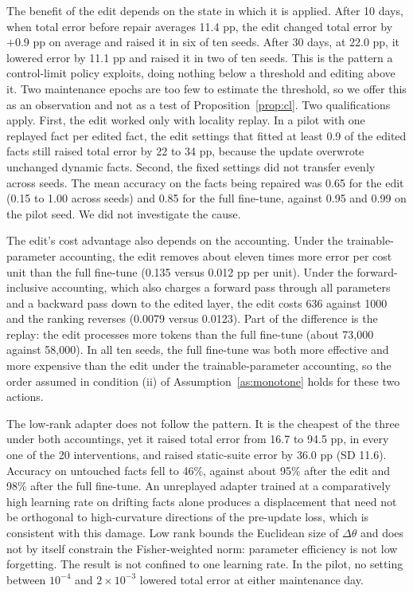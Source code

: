 \documentclass[journal]{IEEEtran}
\begin{document}
The benefit of the edit depends on the state in which it is applied. After 10 days, when total error before repair averages 11.4 pp, the edit changed total error by $+0.9$ pp on average and raised it in six of ten seeds. After 30 days, at 22.0 pp, it lowered error by 11.1 pp and raised it in two of ten seeds. This is the pattern a control-limit policy exploits, doing nothing below a threshold and editing above it. Two maintenance epochs are too few to estimate the threshold, so we offer this as an observation and not as a test of Proposition~\ref{prop:cl}. Two qualifications apply. First, the edit worked only with locality replay. In a pilot with one replayed fact per edited fact, the edit settings that fitted at least 0.9 of the edited facts still raised total error by 22 to 34 pp, because the update overwrote unchanged dynamic facts. Second, the fixed settings did not transfer evenly across seeds. The mean accuracy on the facts being repaired was 0.65 for the edit (0.15 to 1.00 across seeds) and 0.85 for the full fine-tune, against 0.95 and 0.99 on the pilot seed. We did not investigate the cause.

The edit's cost advantage also depends on the accounting. Under the trainable-parameter accounting, the edit removes about eleven times more error per cost unit than the full fine-tune (0.135 versus 0.012 pp per unit). Under the forward-inclusive accounting, which also charges a forward pass through all parameters and a backward pass down to the edited layer, the edit costs 636 against 1000 and the ranking reverses (0.0079 versus 0.0123). Part of the difference is the replay: the edit processes more tokens than the full fine-tune (about 73,000 against 58,000). In all ten seeds, the full fine-tune was both more effective and more expensive than the edit under the trainable-parameter accounting, so the order assumed in condition (ii) of Assumption~\ref{as:monotone} holds for these two actions.

The low-rank adapter does not follow the pattern. It is the cheapest of the three under both accountings, yet it raised total error from 16.7 to 94.5 pp, in every one of the 20 interventions, and raised static-suite error by 36.0 pp (SD 11.6). Accuracy on untouched facts fell to 46\%, against about 95\% after the edit and 98\% after the full fine-tune. An unreplayed adapter trained at a comparatively high learning rate on drifting facts alone produces a displacement that need not be orthogonal to high-curvature directions of the pre-update loss, which is consistent with this damage. Low rank bounds the Euclidean size of $\Delta\theta$ and does not by itself constrain the Fisher-weighted norm: parameter efficiency is not low forgetting. The result is not confined to one learning rate. In the pilot, no setting between $10^{-4}$ and $2\times10^{-3}$ lowered total error at either maintenance day.
\end{document}
